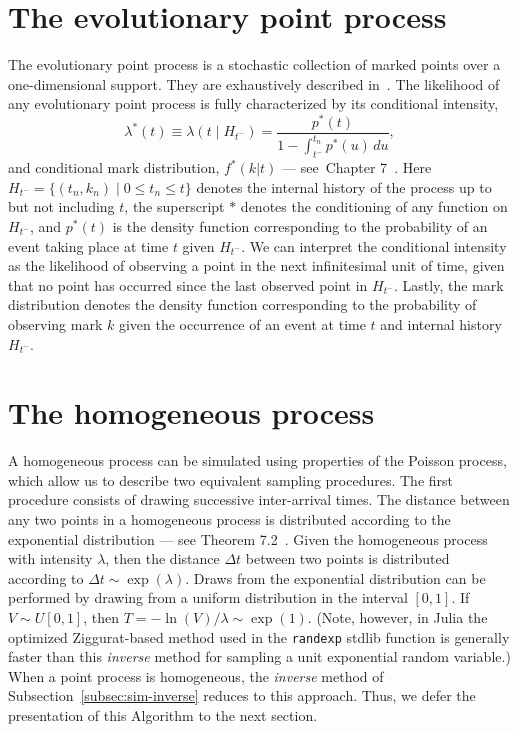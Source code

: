\documentclass{juliacon}
\numberwithin{equation}{section}
\begin{document}
\section{The evolutionary point process} \label{sec:notation}

The evolutionary point process is a stochastic collection of marked points over a one-dimensional support. They are exhaustively described in~\cite{daley2003}. The likelihood of any evolutionary point process is fully characterized by its conditional intensity,
\begin{equation}\label{eq:lambda}
  \lambda^\ast (t) \equiv \lambda(t \mid H_{t^-} ) = \frac{p^\ast(t)}{1 - \int_{t^-}^{t_n} p^\ast(u) \, du},
\end{equation}
and conditional mark distribution, \( f^*(k | t) \) --- see~Chapter 7~\cite{daley2003}. Here \( H_{t^-} = \{ (t_n, k_n) \mid 0 \leq t_n \leq t \} \) denotes the internal history of the process up to but not including \( t \), the superscript \( \ast \) denotes the conditioning of any function on \( H_{t^-} \), and \( p^\ast(t) \) is the density function corresponding to the probability of an event taking place at time \( t \) given \( H_{t^-} \). We can interpret the conditional intensity as the likelihood of observing a point in the next infinitesimal unit of time, given that no point has occurred since the last observed point in \( H_{t^-} \). Lastly, the mark distribution denotes the density function corresponding to the probability of observing mark \( k \) given the occurrence of an event at time \( t \) and internal history \( H_{t^-} \).

\section{The homogeneous process} \label{sec:method-poisson}

A homogeneous process can be simulated using properties of the Poisson process, which allow us to describe two equivalent sampling procedures. The first procedure consists of drawing successive inter-arrival times. The distance between any two points in a homogeneous process is distributed according to the exponential distribution --- see Theorem 7.2~\cite{last2017}. Given the homogeneous process with intensity $\lambda$, then the distance \( \Delta t \) between two points is distributed according to $\Delta t \sim \exp(\lambda)$. Draws from the exponential distribution can be performed by drawing from a uniform distribution in the interval $[0, 1]$. If $V \sim U[0, 1]$, then \( T = - \ln(V) / \lambda \sim \exp(1) \). (Note, however, in Julia the optimized Ziggurat-based method used in the \texttt{randexp} stdlib function is generally faster than this \textit{inverse} method for sampling a unit exponential random variable.) When a point process is homogeneous, the \textit{inverse} method of Subsection~\ref{subsec:sim-inverse} reduces to this approach. Thus, we defer the presentation of this Algorithm to the next section.
\end{document}
